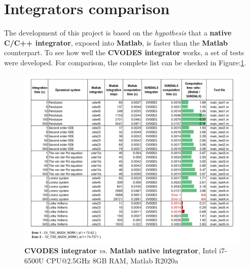 \documentclass[12pt, letterpaper]{article}
\begin{document}
\section{Integrators comparison}
\label{Integrator_comparation}

 The development of this project is based on the \textit{hypothesis} that a \textbf{native C/C++ integrator}, exposed into \textbf{Matlab}, is faster than the \textbf{Matlab} counterpart. To see how well the \textbf{CVODES integrator} works, a set of tests were developed. For comparison, the complete list can be checked in Figure:\ref{label_table}.

\begin{figure}[h!]
    \centering
    \captionsetup{justification=centering}
    \includegraphics[scale=0.70]{images/table.png}
    \caption{\textbf{CVODES integrator} \textit{vs.} \textbf{Matlab native integrator}, \protect\linebreak
        Intel i7-6500U CPU@2.5GHz 8GB RAM, Matlab R2020a}
    \label{label_table}
\end{figure}
\end{document}
